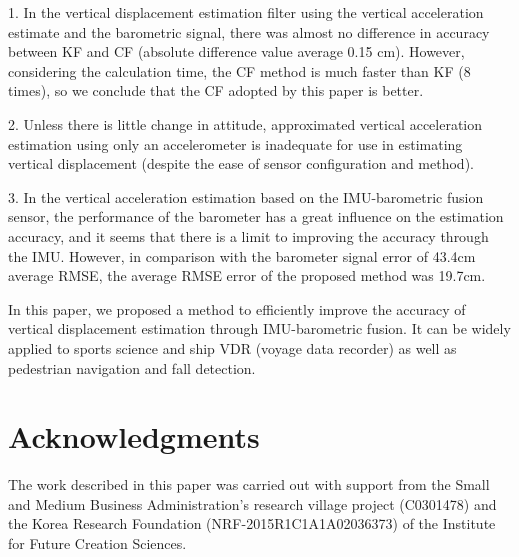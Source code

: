 \documentclass[10pt,journal,compsoc]{IEEEtran}
\begin{document}
1. In the vertical displacement estimation filter using the vertical
acceleration estimate and the barometric signal, there was almost no difference
in accuracy between KF and CF (absolute difference value average 0.15 cm).
However, considering the calculation time, the CF method is much faster than KF
(8 times), so we conclude that the CF adopted by this paper is better.

2. Unless there is little change in attitude, approximated vertical
acceleration estimation using only an accelerometer is inadequate for use in
estimating vertical displacement (despite the ease of sensor configuration and
method).

3. In the vertical acceleration estimation based on the IMU-barometric fusion
sensor, the performance of the barometer has a great influence on the
estimation accuracy, and it seems that there is a limit to improving the accuracy
through the IMU.  However, in comparison with the barometer signal error of
43.4cm average RMSE, the average RMSE error of the proposed method was 19.7cm.

In this paper, we proposed a method to efficiently improve the accuracy of
vertical displacement estimation through IMU-barometric fusion. It can be
widely applied to sports science and ship VDR (voyage data recorder) as well as
pedestrian navigation and fall detection.

\section*{Acknowledgments}

The work described in this paper was carried out with support from the Small
and Medium Business Administration's research village project (C0301478) and
the Korea Research Foundation (NRF-2015R1C1A1A02036373) of the Institute for
Future Creation Sciences.
\end{document}
